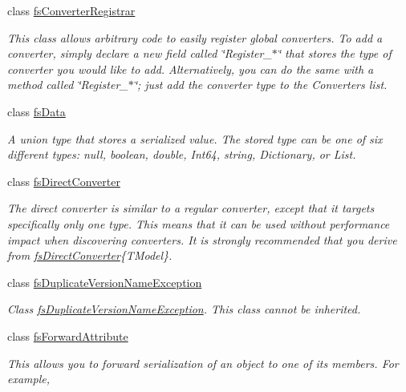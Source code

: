 \begin{DoxyCompactItemize}
class \hyperlink{class_full_serializer_1_1fs_converter_registrar}{fs\+Converter\+Registrar}
\begin{DoxyCompactList}\small\item\em This class allows arbitrary code to easily register global converters. To add a converter, simply declare a new field called \char`\"{}\+Register\+\_\+$\ast$\char`\"{} that stores the type of converter you would like to add. Alternatively, you can do the same with a method called \char`\"{}\+Register\+\_\+$\ast$\char`\"{}; just add the converter type to the {\ttfamily Converters} list. \end{DoxyCompactList}\item 
class \hyperlink{class_full_serializer_1_1fs_data}{fs\+Data}
\begin{DoxyCompactList}\small\item\em A union type that stores a serialized value. The stored type can be one of six different types\+: null, boolean, double, Int64, string, Dictionary, or List. \end{DoxyCompactList}\item 
class \hyperlink{class_full_serializer_1_1fs_direct_converter}{fs\+Direct\+Converter}
\begin{DoxyCompactList}\small\item\em The direct converter is similar to a regular converter, except that it targets specifically only one type. This means that it can be used without performance impact when discovering converters. It is strongly recommended that you derive from \hyperlink{class_full_serializer_1_1fs_direct_converter}{fs\+Direct\+Converter}\{T\+Model\}. \end{DoxyCompactList}\item 
class \hyperlink{class_full_serializer_1_1fs_duplicate_version_name_exception}{fs\+Duplicate\+Version\+Name\+Exception}
\begin{DoxyCompactList}\small\item\em Class \hyperlink{class_full_serializer_1_1fs_duplicate_version_name_exception}{fs\+Duplicate\+Version\+Name\+Exception}. This class cannot be inherited. \end{DoxyCompactList}\item 
class \hyperlink{class_full_serializer_1_1fs_forward_attribute}{fs\+Forward\+Attribute}
\begin{DoxyCompactList}\small\item\em This allows you to forward serialization of an object to one of its members. For example, \end{DoxyCompactList}\item 

\end{DoxyCompactItemize}
